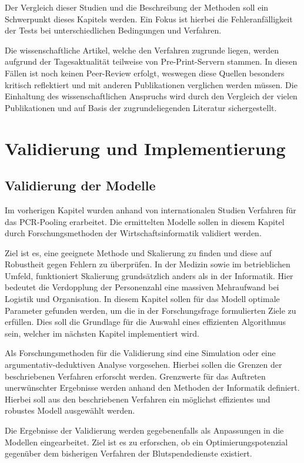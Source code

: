 Der Vergleich dieser Studien und die Beschreibung der Methoden soll ein Schwerpunkt dieses Kapitels werden.
Ein Fokus ist hierbei die Fehleranfälligkeit der Tests bei unterschiedlichen Bedingungen und Verfahren.

Die wissenschaftliche Artikel, welche den Verfahren zugrunde liegen, werden aufgrund der Tagesaktualität teilweise von Pre-Print-Servern stammen.
In diesen Fällen ist noch keinen Peer-Review erfolgt, weswegen diese Quellen besonders kritisch reflektiert und mit anderen Publikationen verglichen werden müssen.
Die Einhaltung des wissenschaftlichen Anspruchs wird durch den Vergleich der vielen Publikationen und auf Basis der zugrundeliegenden Literatur sichergestellt.

\section{Validierung und Implementierung}
\subsection{Validierung der Modelle}
Im vorherigen Kapitel wurden anhand von internationalen Studien Verfahren für das PCR-Pooling erarbeitet.
Die ermittelten Modelle sollen in diesem Kapitel durch Forschungsmethoden der Wirtschaftsinformatik validiert werden.

Ziel ist es, eine geeignete Methode und Skalierung zu finden und diese auf Robustheit gegen Fehlern zu überprüfen.
In der Medizin sowie im betrieblichen Umfeld, funktioniert Skalierung grundsätzlich anders als in der Informatik.
Hier bedeutet die Verdopplung der Personenzahl eine massiven Mehraufwand bei Logistik und Organisation.
In diesem Kapitel sollen für das Modell optimale Parameter gefunden werden, um die in der Forschungsfrage formulierten Ziele zu erfüllen.
Dies soll die Grundlage für die Auswahl eines effizienten Algorithmus sein, welcher im nächsten Kapitel implementiert wird.

Als Forschungsmethoden für die Validierung sind eine Simulation oder eine argumentativ-deduktiven Analyse vorgesehen.
Hierbei sollen die Grenzen der beschriebenen Verfahren erforscht werden.
Grenzwerte für das Auftreten unerwünschter Ergebnisse werden anhand den Methoden der Informatik definiert.
Hierbei soll aus den beschriebenen Verfahren ein möglichst effizientes und robustes Modell ausgewählt werden.

Die Ergebnisse der Validierung werden gegebenenfalls als Anpassungen in die Modellen eingearbeitet.
Ziel ist es zu erforschen, ob ein Optimierungspotenzial gegenüber dem bisherigen Verfahren der Blutspendedienste existiert.

